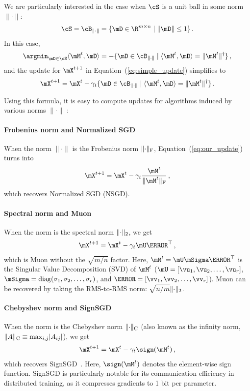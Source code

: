 \documentclass[smallextended,referee,envcountsect]{svjour3}
\newcommand{\norm}[1]{\lVert #1\rVert}
\DeclarePairedDelimiter{\normf}{\|}{\|_\mathrm{F}}
\DeclarePairedDelimiter{\norms}{\|}{\|_{\mathrm{2}}}
\DeclarePairedDelimiter{\normc}{\|}{\|_{\mathrm{C}}}
\DeclarePairedDelimiter{\abs}{\lvert}{\rvert}
\def\<#1,#2>{\langle #1,#2\rangle}
\DeclareMathOperator{\diag}{diag}
\newcommand{\Rmn}{\R^{m\times n}}
\newcommand{\equationref}[1]{Equation~(\ref{#1})}
\begin{document}
 We are particularly interested in the case when $\cS$ is a unit ball in some norm $\norm{\cdot}$:
 \[
 \cS = \cB_{\norm{\cdot}} = \{ \mD \in \Rmn \mid \norm{\mD} \leq 1 \}\,.
 \]
 In this case,
 \[
 \argmin_{\mD \in \cS} \<\mM^t, \mD> = - \{ \mD \in \cB_{\norm{\cdot}} \mid \<\mM^t, \mD> = \norm{\mM^t}^\dagger\}\,,
 \]
 and the update for $\mX^{t + 1}$ in \equationref{eq:simple_update} simplifies to
 \begin{equation}\label{eq:our_update}
   \mX^{t+1} = \mX^{t} - \gamma_t \{\mD \in \cB_{\norm{\cdot}} \mid \<\mM^t, \mD> = \norm{\mM^t}^\dagger\}\,.
 \end{equation}
 
 Using this formula, it is easy to compute updates for algorithms induced by various norms $\norm{\cdot}$ \citep{bernstein2024oldoptimizernewnorm, pethick2025training}:
 
 \paragraph{Frobenius norm and Normalized SGD}
 When the norm $\norm{\cdot}$ is the Frobenius norm $\normf{\cdot}$, \equationref{eq:our_update} turns into
 \begin{equation}\label{eq:nsgd_update}
   \mX^{t+1} = \mX^{t} - \gamma_t \frac{\mM^t}{\normf{\mM^t}}\,,
 \end{equation}
 which recovers Normalized SGD (NSGD).
 
 \paragraph{Spectral norm and Muon}
 When the norm is the spectral norm $\norms{\cdot}$, we get
 \begin{equation}\label{eq:muon_update}
   \mX^{t+1} = \mX^{t} - \gamma_t \mU \mV^\top\,,
 \end{equation}
 which is Muon without the $\sqrt{m/n}$ factor.
 Here, $\mM^t = \mU \mSigma \mV^\top$ is the Singular Value Decomposition (SVD) of $\mM^t$ ($\mU = [\vu_1, \vu_2, \dots, \vu_r]$, $\mSigma = \diag(\sigma_1, \sigma_2, \dots, \sigma_r)$, and $\mV = [\vv_1, \vv_2, \dots, \vv_r]$). Muon can be recovered by taking the RMS-to-RMS norm: $\sqrt{n/m}\norms{\cdot}$.
 
 \paragraph{Chebyshev norm and SignSGD}
 When the norm is the Chebyshev norm $\normc{\cdot}$ (also known as the infinity norm, $\normc{A} \equiv \max_{i,j}\abs{A_{ij}}$), we get
 \begin{equation}\label{eq:signsgd_update}
   \mX^{t+1} = \mX^{t} - \gamma_t \sign(\mM^t)\,,
 \end{equation}
 which recovers SignSGD~\citep{bernstein2018signsgd}. Here, $\sign(\mM^t)$ denotes the element-wise sign function. SignSGD is particularly notable for its communication efficiency in distributed training, as it compresses gradients to 1 bit per parameter.
 
\end{document}
